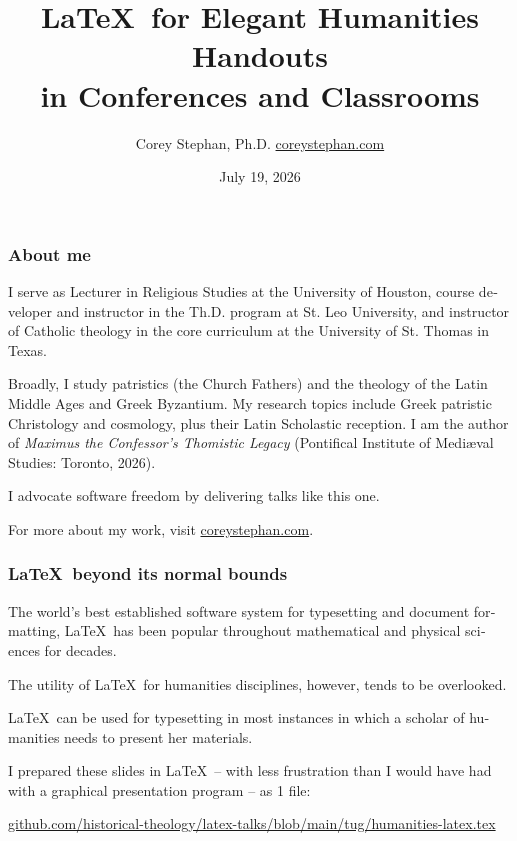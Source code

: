 \documentclass[aspectratio=169]{beamer}
\date{July 19, 2026}
\title{\LaTeX\ for Elegant Humanities Handouts \\ in Conferences and Classrooms }
\author{Corey Stephan, Ph.D. \break \href{https://www.coreystephan.com}{coreystephan.com}}
\begin{document}
\setdefaultlanguage{english}
	
\begin{frame}[plain]
    \maketitle
\end{frame}

\begin{frame}
	\frametitle[About me]{About me}
I serve as Lecturer in Religious Studies at the University of Houston, course developer and instructor in the Th.D. program at St. Leo University, and instructor of Catholic theology in the core curriculum at the University of St. Thomas in Texas. \break

Broadly, I study patristics (the Church Fathers) and the theology of the Latin Middle Ages and Greek Byzantium. My research topics include Greek patristic Christology and cosmology, plus their Latin Scholastic reception. I am the author of \textit{Maximus the Confessor’s Thomistic Legacy} (Pontifical Institute of Medi\ae val Studies: Toronto, 2026). \break

I advocate software freedom by delivering talks like this one. \break

For more about my work, visit \href{https://www.coreystephan.com}{coreystephan.com}. \break

\end{frame}

\begin{frame}
    \frametitle[Everything]{\LaTeX\ beyond its normal bounds}
The world's best established software system for typesetting and document formatting, \LaTeX\ has been popular throughout mathematical and physical sciences for decades. \break

The utility of \LaTeX\ for humanities disciplines, however, tends to be overlooked. \break

\LaTeX\ can be used for typesetting in most instances in which a scholar of humanities needs to present her materials. \break

I prepared these slides in \LaTeX\ -- with less frustration than I would have had with a graphical presentation program -- as 1 file:\break

{\href{https://github.com/historical-theology/latex-talks/blob/main/tug/humanities-latex.tex}{github.com/historical-theology/latex-talks/blob/main/tug/humanities-latex.tex}}

\end{frame}
\end{document}
